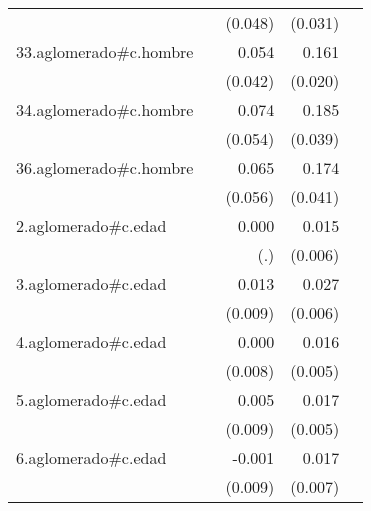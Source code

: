 {\begin{longtable}{l*{4}{D{.}{.}{-1}}}
            &                     &     (0.048)         &     (0.031)         &                     \\
\addlinespace
33.aglomerado#c.hombre&                     &       0.054         &       0.161\sym{***}&                     \\
            &                     &     (0.042)         &     (0.020)         &                     \\
\addlinespace
34.aglomerado#c.hombre&                     &       0.074         &       0.185\sym{***}&                     \\
            &                     &     (0.054)         &     (0.039)         &                     \\
\addlinespace
36.aglomerado#c.hombre&                     &       0.065         &       0.174\sym{***}&                     \\
            &                     &     (0.056)         &     (0.041)         &                     \\
\addlinespace
2.aglomerado#c.edad&                     &       0.000         &       0.015\sym{*}  &                     \\
            &                     &         (.)         &     (0.006)         &                     \\
\addlinespace
3.aglomerado#c.edad&                     &       0.013         &       0.027\sym{***}&                     \\
            &                     &     (0.009)         &     (0.006)         &                     \\
\addlinespace
4.aglomerado#c.edad&                     &       0.000         &       0.016\sym{**} &                     \\
            &                     &     (0.008)         &     (0.005)         &                     \\
\addlinespace
5.aglomerado#c.edad&                     &       0.005         &       0.017\sym{**} &                     \\
            &                     &     (0.009)         &     (0.005)         &                     \\
\addlinespace
6.aglomerado#c.edad&                     &      -0.001         &       0.017\sym{*}  &                     \\
            &                     &     (0.009)         &     (0.007)         &                     \\

\end{longtable}}
